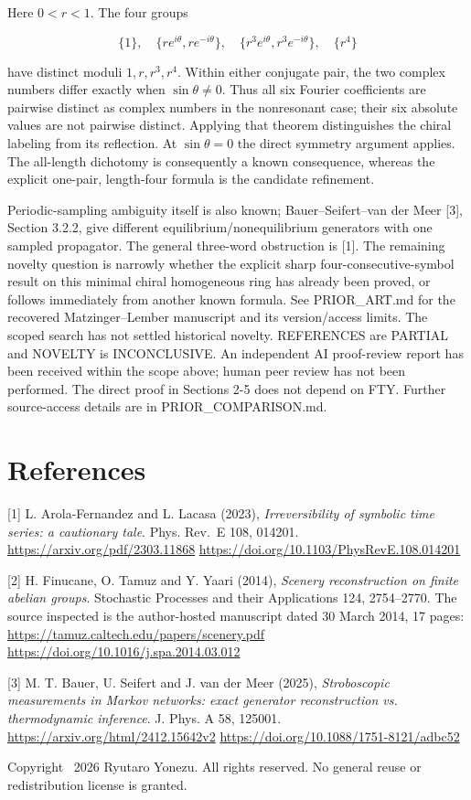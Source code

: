 \documentclass[11pt,a4paper]{article}
\begin{document}
Here \(0<r<1\). The four groups

\[\{1\},\quad\{re^{i\theta},re^{-i\theta}\},\quad
\{r^3e^{i\theta},r^3e^{-i\theta}\},\quad\{r^4\}\]

have distinct moduli \(1,r,r^3,r^4\). Within either conjugate pair, the
two complex numbers differ exactly when \(\sin\theta\ne0\). Thus all six
Fourier coefficients are pairwise distinct as complex numbers in the
nonresonant case; their six absolute values are not pairwise distinct.
Applying that theorem distinguishes the chiral labeling from its
reflection. At \(\sin\theta=0\) the direct symmetry argument applies.
The all-length dichotomy is consequently a known consequence, whereas
the explicit one-pair, length-four formula is the candidate refinement.

Periodic-sampling ambiguity itself is also known; Bauer--Seifert--van
der Meer {[}3{]}, Section 3.2.2, give different
equilibrium/nonequilibrium generators with one sampled propagator. The
general three-word obstruction is {[}1{]}. The remaining novelty
question is narrowly whether the explicit sharp four-consecutive-symbol
result on this minimal chiral homogeneous ring has already been proved,
or follows immediately from another known formula. See PRIOR\_ART.md for
the recovered Matzinger--Lember manuscript and its version/access
limits. The scoped search has not settled historical novelty. REFERENCES
are PARTIAL and NOVELTY is INCONCLUSIVE. An independent AI proof-review
report has been received within the scope above; human peer review has
not been performed. The direct proof in Sections 2-5 does not depend on
FTY. Further source-access details are in PRIOR\_COMPARISON.md.

\hypertarget{references}{%
\section*{References}\label{references}}

{[}1{]} L. Arola-Fernandez and L. Lacasa (2023), \emph{Irreversibility
of symbolic time series: a cautionary tale}. Phys. Rev.~E 108, 014201.
\url{https://arxiv.org/pdf/2303.11868}
\url{https://doi.org/10.1103/PhysRevE.108.014201}

{[}2{]} H. Finucane, O. Tamuz and Y. Yaari (2014), \emph{Scenery
reconstruction on finite abelian groups}. Stochastic Processes and their
Applications 124, 2754--2770. The source inspected is the author-hosted
manuscript dated 30 March 2014, 17 pages:
\url{https://tamuz.caltech.edu/papers/scenery.pdf}
\url{https://doi.org/10.1016/j.spa.2014.03.012}

{[}3{]} M. T. Bauer, U. Seifert and J. van der Meer (2025),
\emph{Stroboscopic measurements in Markov networks: exact generator
reconstruction vs. thermodynamic inference}. J. Phys. A 58, 125001.
\url{https://arxiv.org/html/2412.15642v2}
\url{https://doi.org/10.1088/1751-8121/adbc52}

\bigskip
\noindent\small Copyright \textcopyright\ 2026 Ryutaro Yonezu. All rights reserved.
No general reuse or redistribution license is granted.
\end{document}
